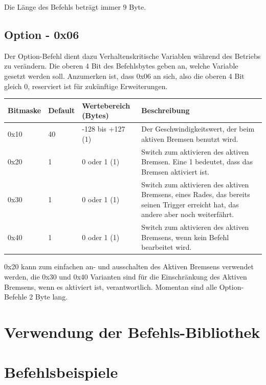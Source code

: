 \documentclass[a4paper]{article}
\begin{document}
	Die Länge des Befehls beträgt immer 9 Byte.

	\subsection{Option - 0x06}

	Der Option-Befehl dient dazu Verhaltenskritische Variablen während des Betriebs zu verändern.
	Die oberen 4 Bit des Befehlsbytes geben an, welche Variable gesetzt werden soll. Anzumerken ist,
	dass 0x06 an sich, also die oberen 4 Bit gleich 0, reserviert ist für zukünftige Erweiterungen.

	\begin{tabularx}{\linewidth}{|l|l|l|X|}
		\hline
		\textbf{Bitmaske} & \textbf{Default} & \textbf{Wertebereich (Bytes)} & \textbf{Beschreibung} \\
		\hline
		\hline
		0x10 & 40 & -128 bis +127 (1) & Der Geschwindigkeitswert, der beim aktiven Bremsen benutzt wird. \\
		\hline
		0x20 & 1 & 0 oder 1 (1) & Switch zum aktivieren des aktiven Bremsen. Eine 1 bedeutet, dass das Bremsen aktiviert ist. \\
		\hline
		0x30 & 1 & 0 oder 1 (1) & Switch zum aktivieren des aktiven Bremsens, eines Rades, das bereits seinen Trigger erreicht hat, das andere aber noch weiterfährt. \\
		\hline
		0x40 & 1 & 0 oder 1 (1) & Switch zum aktivieren des aktiven Bremsens, wenn kein Befehl bearbeitet wird. \\
		\hline
	\end{tabularx}

	0x20 kann zum einfachen an- und ausschalten des Aktiven Bremsens verwendet werden,
	die 0x30 und 0x40 Varianten sind für die Einschränkung des Aktiven Bremsens, wenn es
	aktiviert ist, verantwortlich. Momentan sind alle Option-Befehle 2 Byte lang.
	
	\section{Verwendung der Befehls-Bibliothek}
	\section{Befehlsbeispiele}
\end{document}

